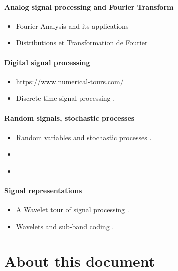 \paragraph{Analog signal processing and Fourier Transform}

\begin{itemize}
    \item Fourier Analysis and its applications \cite{vretblad2003fourier}
    \item Distributions et Transformation de Fourier \cite{roddier1985distributions}
  \end{itemize}

  \paragraph{Digital signal processing}

  \begin{itemize}
    \item   \url{https://www.numerical-tours.com/}
    
    \item  Discrete-time signal processing \cite{oppenheim1999discrete}.
  \end{itemize}

\paragraph{Random signals, stochastic processes}

\begin{itemize}
    \item Random variables and stochastic processes \cite{papoulis1965random}.
    \item \cite{ross1996stochastic}
    \item \cite{kay1993fundamentals}
\end{itemize}



\paragraph{Signal representations}
\begin{itemize}
    \item A Wavelet tour of signal processing \cite{mallat1999wavelet}.
    \item Wavelets and sub-band coding \cite{vetterli1995wavelets}.
\end{itemize}

\section{About this document}


